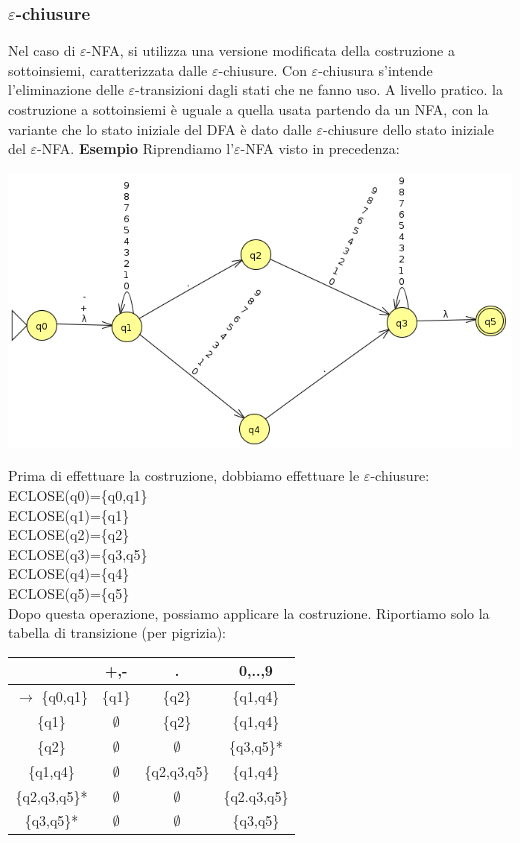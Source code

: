 \documentclass[]{article}
\begin{document}
			\subsubsection{$\varepsilon$-chiusure}
				Nel caso di $\varepsilon$-NFA, si utilizza una versione modificata della costruzione a sottoinsiemi, caratterizzata dalle $\varepsilon$-chiusure. Con $\varepsilon$-chiusura s'intende l'eliminazione delle $\varepsilon$-transizioni dagli stati che ne fanno uso.\newline
				A livello pratico. la costruzione a sottoinsiemi è uguale a quella usata partendo da un NFA, con la variante che lo stato iniziale del DFA è dato dalle $\varepsilon$-chiusure dello stato iniziale del $\varepsilon$-NFA.
				\newline \newline
				\textbf{Esempio} Riprendiamo l'$\varepsilon$-NFA visto in precedenza:
				\begin{center}
					\includegraphics[scale=0.7]{e-NFA1.png}
				\end{center}
				Prima di effettuare la costruzione, dobbiamo effettuare le $\varepsilon$-chiusure: \newline \\
				ECLOSE(q0)=\{q0,q1\}\\
				ECLOSE(q1)=\{q1\}\\
				ECLOSE(q2)=\{q2\}\\
				ECLOSE(q3)=\{q3,q5\}\\
				ECLOSE(q4)=\{q4\}\\
				ECLOSE(q5)=\{q5\}\\
				Dopo questa operazione, possiamo applicare la costruzione. Riportiamo solo la tabella di transizione (per pigrizia):
				\begin{center}
					\begin{tabular}{c|c|c|c}
						&+,-&.&0,..,9 \\
						\hline
						$\rightarrow$ \{q0,q1\} &\{q1\}&\{q2\}&\{q1,q4\} \\
						\{q1\} &$\emptyset$&\{q2\}&\{q1,q4\} \\
						\{q2\} &$\emptyset$&$\emptyset$&\{q3,q5\}* \\
						\{q1,q4\} &$\emptyset$&\{q2,q3,q5\}&\{q1,q4\} \\
						\{q2,q3,q5\}* &$\emptyset$&$\emptyset$&\{q2.q3,q5\} \\
						\{q3,q5\}* &$\emptyset$&$\emptyset$&\{q3,q5\} \\
					\end{tabular}
				\end{center}
\end{document}
